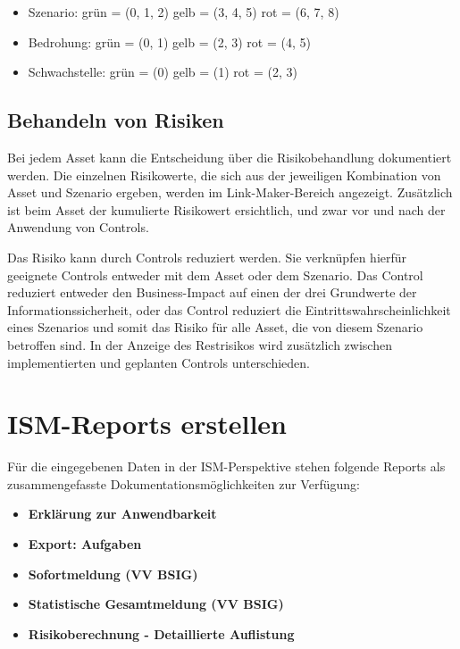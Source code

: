 \documentclass[a4paper,10pt]{book}
\begin{document}
\begin{itemize}
 \item Szenario:
 \subitem grün = (0, 1, 2)
 \subitem gelb = (3, 4, 5)
 \subitem rot = (6, 7, 8)
\end{itemize}

\begin{itemize}
 \item Bedrohung:
 \subitem grün = (0, 1)
 \subitem gelb = (2, 3)
 \subitem rot = (4, 5)
\end{itemize}

\begin{itemize}
 \item Schwachstelle:
 \subitem grün = (0)
 \subitem gelb = (1)
 \subitem rot = (2, 3)
\end{itemize}


\subsection{Behandeln von Risiken}
Bei jedem Asset kann die Entscheidung über die Risikobehandlung dokumentiert
werden. Die einzelnen Risikowerte, die sich aus der jeweiligen Kombination von
Asset und Szenario ergeben, werden im Link-Maker-Bereich angezeigt. Zusätzlich
ist beim Asset der kumulierte Risikowert ersichtlich, und zwar vor und nach der
Anwendung von Controls.

Das Risiko kann durch Controls reduziert werden. Sie verknüpfen hierfür
geeignete Controls entweder mit dem Asset oder dem Szenario. Das Control
reduziert entweder den Business-Impact auf einen der drei Grundwerte der
Informationssicherheit, oder das Control reduziert die
Eintrittswahrscheinlichkeit eines Szenarios und somit das Risiko für alle Asset,
die von diesem Szenario betroffen sind. In der Anzeige des Restrisikos wird
zusätzlich zwischen implementierten und geplanten Controls unterschieden.

\section{ISM-Reports erstellen}
\label{ISM-Reports erstellen}

Für die eingegebenen Daten in der ISM-Perspektive stehen folgende Reports als
zusammengefasste Dokumentationsmöglichkeiten zur Verfügung:

\begin{itemize}
\item \textbf{Erklärung zur Anwendbarkeit}
\item \textbf{Export: Aufgaben}
\item \textbf{Sofortmeldung (VV BSIG)}
\item \textbf{Statistische Gesamtmeldung (VV BSIG)}
\item \textbf{Risikoberechnung - Detaillierte Auflistung}
\end{itemize}
\end{document}
